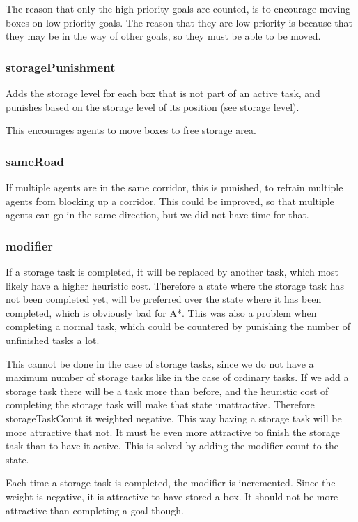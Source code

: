 \documentclass[letterpaper]{article}
\begin{document}
The reason that only the high priority goals are counted, is to encourage moving
boxes on low priority goals. The reason that they are low priority is because that
they may be in the way of other goals, so they must be able to be moved.

\subsubsection{storagePunishment}
Adds the storage level for each box that is not part of an active task, and
punishes based on the storage level of its position (see storage level).

This encourages agents to move boxes to free storage area.

\subsubsection{sameRoad}
If multiple agents are in the same corridor, this is punished, to refrain multiple
agents from blocking up a corridor. This could be improved, so that multiple agents
can go in the same direction, but we did not have time for that.

\subsubsection{modifier}
If a storage task is completed, it will be replaced by another task, which most likely
have a higher heuristic cost. Therefore a state where the storage task has not been completed
yet, will be preferred over the state where it has been completed, which is obviously bad
for A*. This was also a problem when completing a normal task, which could be countered
by punishing the number of unfinished tasks a lot.

This cannot be done in the case of storage tasks, since we do not have a maximum number of
storage tasks like in the case of ordinary tasks. If we add a storage task there will be
a task more than before, and the heuristic cost of completing the storage task will make that
state unattractive. Therefore storageTaskCount it weighted negative. This way having a storage
task will be more attractive that not. It must be even more attractive to finish the storage
task than to have it active. This is solved by adding the modifier count to the state.

Each time a storage task is completed, the modifier is incremented. Since the weight is
negative, it is attractive to have stored a box. It should not be more attractive than
completing a goal though.
\end{document}
